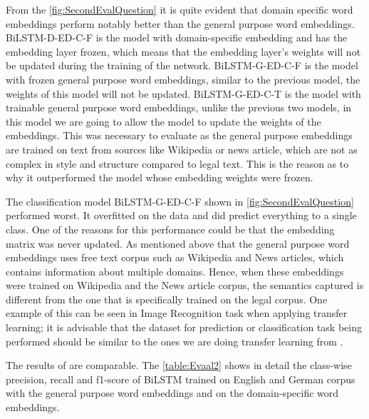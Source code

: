 From the \ref{fig:SecondEvalQuestion} it is quite evident that domain specific word embeddings perform notably better than the general purpose word embeddings. BiLSTM-D-ED-C-F is the model with domain-specific embedding and has the embedding layer frozen, which means that the embedding layer's weights will not be updated during the training of the network. BiLSTM-G-ED-C-F is the model with frozen general purpose word embeddings, similar to the previous model, the weights of this model will not be updated. BiLSTM-G-ED-C-T is the model with trainable general purpose word embeddings, unlike the previous two models, in this model we are going to allow the model to update the weights of the embeddings. This was necessary to evaluate as the general purpose embeddings are trained on text from sources like Wikipedia or news article, which are not as complex in style and structure compared to legal text. This is the reason as to why it outperformed the model whose embedding weights were frozen. 

The classification model BiLSTM-G-ED-C-F shown in \ref{fig:SecondEvalQuestion} performed worst. It overfitted on the data and did predict everything to a single class. One of the reasons for this performance could be that the embedding matrix was never updated. As mentioned above that the general purpose word embeddings uses free text corpus such as Wikipedia and News articles, which contains information about multiple domains. Hence, when these embeddings were trained on Wikipedia and the News article corpus, the semantics captured is different from the one that is specifically trained on the legal corpus. One example of this can be seen in Image Recognition task when applying transfer learning; it is advisable that the dataset for prediction or classification task being performed should be similar to the ones we are doing transfer learning from \cite{iglovikov2018ternausnet}.


The results of  are comparable. The \ref{table:Evaal2} shows in detail the class-wise precision, recall and f1-score of \gls{BiLSTM} trained on English and German corpus with the general purpose word embeddings and on the domain-specific word embeddings.

